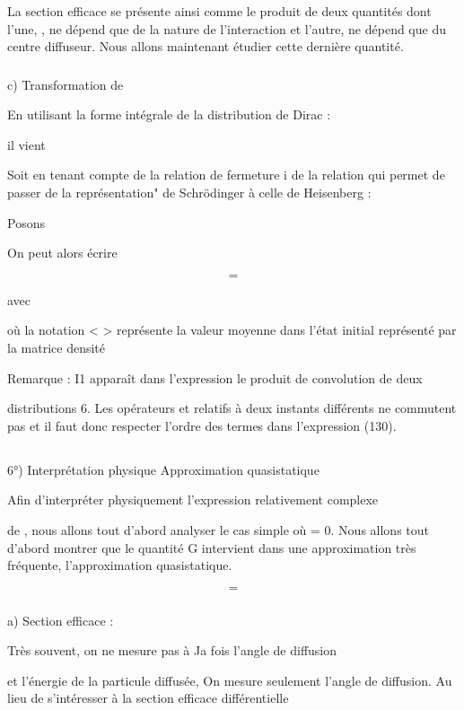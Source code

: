 La section efficace se présente ainsi comme le produit de deux quantités dont
l'une, , ne dépend que de la nature de l'interaction et l'autre,
ne dépend que du centre diffuseur. Nous allons maintenant étudier cette dernière quantité.
\subsubsection{}%
c) Transformation de 

En utilisant la forme intégrale de la distribution de Dirac :

il vient

Soit en tenant compte de la relation de fermeture i de la
relation qui permet de passer de la représentation" de Schrödinger à celle de
Heisenberg :

Posons

On peut alors écrire

\[
\tag{129}=
\]

avec

où la notation < > représente la valeur moyenne dans l'état initial représenté
par la matrice densité

Remarque : I1 apparaît dans l'expression  le produit de convolution de deux

distributions 6. Les opérateurs  et  relatifs à deux instants différents
ne commutent pas et il faut donc respecter l'ordre des termes dans l'expression (130).

\subsection{}%
6°) Interprétation physique Approximation quasistatique

 

Afin d'interpréter physiquement l'expression relativement complexe

de , nous allons tout d'abord analyser le cas simple où  = 0. Nous allons
tout d'abord montrer que le quantité G  intervient dans une approximation
très fréquente, l'approximation quasistatique.

\[
\tag{131}=
\]

\subsubsection{}%
a) Section efficace :

Très souvent, on ne mesure pas à Ja fois l'angle de diffusion

et l'énergie de la particule diffusée, On mesure seulement l'angle de diffusion.
Au lieu de s'intéresser à la section efficace différentielle


